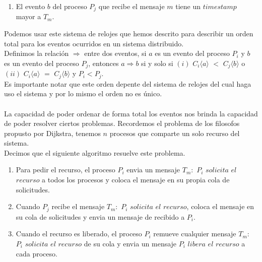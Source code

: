 \documentclass{article}
\begin{document}
\begin{enumerate}
{\begin{enumerate}
{\begin{enumerate}
              \item{El evento $b$ del proceso $P_j$ que recibe el
                  mensaje $m$ tiene un $timestamp$ mayor a $T_m$.}

            \end{enumerate} 
          }
        \end{enumerate}
        
        Podemos usar este sistema de relojes que hemos descrito
        para describir un orden total para los eventos ocurridos
        en un sistema distribuido.\\
        Definimos la relación $\Rightarrow$ entre dos eventos, si
        $a$ es un evento del proceso $P_i$ y $b$ es un evento del
        proceso $P_j$, entonces $a \Rightarrow b$ si y solo si $(i)$
        $C_i \langle a \rangle$ $<$ $C_j \langle b \rangle$ o $(ii)$ 
        $C_i \langle a \rangle$ $=$ $C_j \langle b \rangle$ y $P_i
        < P_j$.\\
        Es importante notar que este orden depente del sistema de
        relojes del cual haga uso el sistema y por lo mismo el orden
        no es único.\\
        \\
        La capacidad de poder ordenar de forma total los eventos nos
        brinda la capacidad de poder resolver ciertos
        problemas. Recordemos  el problema de los filosofos propusto
        por Dijkstra,  tenemos $n$ procesos que comparte un solo
        recurso del sistema.\\
        Decimos que el siguiente algoritmo resuelve este problema.\\

        \begin{enumerate}
        \item{Para pedir el recurso, el proceso $P_i$ envia un mensaje
            $T_m:$ $P_i$ $solicita$ $el$ $recurso$ a todos los
            procesos y coloca el mensaje en su propia cola de solicitudes.
          }

        \item{Cuando $P_j$ recibe el mensaje  $T_m:$ $P_i$ $solicita$
            $el$ $recurso$, coloca el mensaje en su cola de
            solicitudes y envia un mensaje de recibido a $P_i$.}

        \item{Cuando el recurso es liberado, el proceso $P_i$ remueve
            cualquier mensaje $T_m:$ $P_i$ $solicita$
            $el$ $recurso$ de su cola y envia un mensaje $P_i$ $libera$
            $el$ $recurso$ a cada proceso.}


\end{enumerate}}
\end{enumerate}
\end{document}
